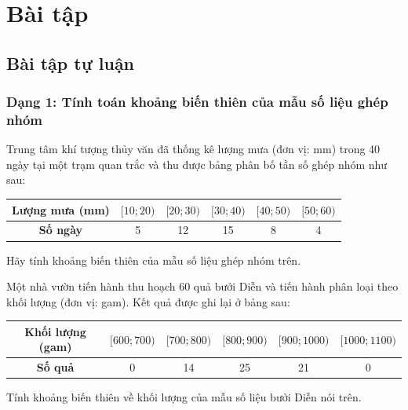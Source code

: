 \documentclass[12pt]{article}
\begin{document}
	
	\newpage
	\section{Bài tập}
	\subsection{Bài tập tự luận}
	\subsubsection{Dạng 1: Tính toán khoảng biến thiên của mẫu số liệu ghép nhóm}
	
	\begin{btxanh}[title={Bài 1}]
		Trung tâm khí tượng thủy văn đã thống kê lượng mưa (đơn vị: mm) trong 40 ngày tại một trạm quan trắc và thu được bảng phân bố tần số ghép nhóm như sau:
		\begin{center}
			\renewcommand{\arraystretch}{1.3}
			\begin{tabular}{|c|c|c|c|c|c|}
				\hline
				\textbf{Lượng mưa (mm)} & $[10; 20)$ & $[20; 30)$ & $[30; 40)$ & $[40; 50)$ & $[50; 60)$ \\
				\hline
				\textbf{Số ngày} & 5 & 12 & 15 & 8 & 4 \\
				\hline
			\end{tabular}
		\end{center}
		Hãy tính khoảng biến thiên của mẫu số liệu ghép nhóm trên.
	\end{btxanh}
	
	\begin{btxanh}[title={Bài 2}]
		Một nhà vườn tiến hành thu hoạch 60 quả bưởi Diễn và tiến hành phân loại theo khối lượng (đơn vị: gam). Kết quả được ghi lại ở bảng sau:
		\begin{center}
			\renewcommand{\arraystretch}{1.3}
			\begin{tabular}{|c|c|c|c|c|c|}
				\hline
				\textbf{Khối lượng (gam)} & $[600; 700)$ & $[700; 800)$ & $[800; 900)$ & $[900; 1000)$ & $[1000; 1100)$ \\
				\hline
				\textbf{Số quả} & 0 & 14 & 25 & 21 & 0 \\
				\hline
			\end{tabular}
		\end{center}
		Tính khoảng biến thiên về khối lượng của mẫu số liệu bưởi Diễn nói trên.
	\end{btxanh}
	
\end{document}
